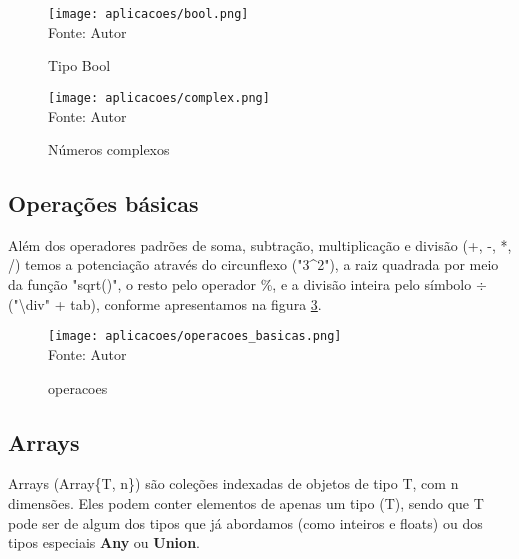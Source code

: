     \begin{figure}[H]
    \begin{center}
        \caption{Tipo Bool} \label{bool}
        \texttt{[image: aplicacoes/bool.png]} \\
        {\tiny \sf Fonte: Autor}
    \end{center}
    \end{figure} 

  \begin{figure}[H]
  \begin{center}
      \caption{Números complexos} \label{complex}
      \texttt{[image: aplicacoes/complex.png]} \\
      {\tiny \sf Fonte: Autor}
  \end{center}
  \end{figure} 

\subsection{Operações básicas}
Além dos operadores padrões de soma, subtração, multiplicação e divisão (+, -, *, /) temos a potenciação através do circunflexo ("3\^{}2"), a raiz quadrada por meio da função "sqrt()", o resto pelo operador \%, e a divisão inteira pelo símbolo $\div$ ("\textbackslash div" + tab), conforme apresentamos na figura \ref{operacoes}. 

    \begin{figure}[H]
    \begin{center}
        \caption{operacoes} \label{operacoes}
        \texttt{[image: aplicacoes/operacoes\_basicas.png]} \\
        {\tiny \sf Fonte: Autor}
    \end{center}
    \end{figure} 



\subsection{Arrays}
Arrays (Array\{T, n\}) são coleções indexadas de objetos de tipo T, com n dimensões. %
 Eles podem conter elementos de apenas um tipo (T), sendo que T pode ser de algum dos tipos que já abordamos (como inteiros e floats) ou dos tipos especiais \textbf{Any} ou \textbf{Union{}}.
 

